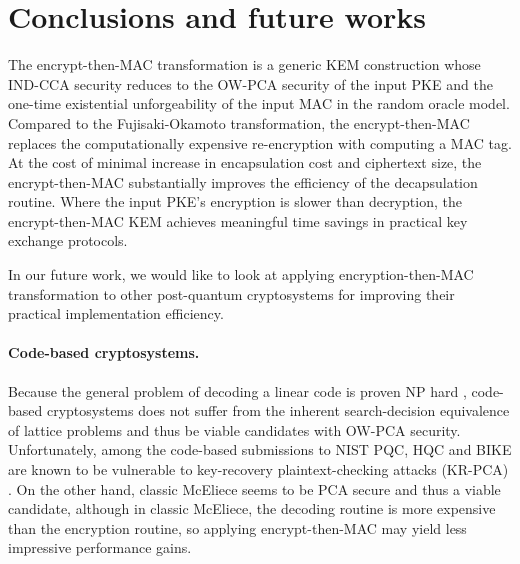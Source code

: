 \documentclass[journal=tches,submission]{iacrtrans}
\newcommand{\us}{\mu s}
\begin{document}
\begin{table}[h]
\end{table}

\section{Conclusions and future works}\label{sec:future-works}
The encrypt-then-MAC transformation is a generic KEM construction whose IND-CCA security reduces to the OW-PCA security of the input PKE and the one-time existential unforgeability of the input MAC in the random oracle model. Compared to the Fujisaki-Okamoto transformation, the encrypt-then-MAC replaces the computationally expensive re-encryption with computing a MAC tag. At the cost of minimal increase in encapsulation cost and ciphertext size, the encrypt-then-MAC substantially improves the efficiency of the decapsulation routine. Where the input PKE's encryption is slower than decryption, the encrypt-then-MAC KEM achieves meaningful time savings in practical key exchange protocols.

In our future work, we would like to look at applying encryption-then-MAC transformation to other post-quantum cryptosystems for improving their practical implementation efficiency.

\paragraph{Code-based cryptosystems.} Because the general problem of decoding a linear code is proven NP hard \cite{DBLP:journals/tit/BerlekampMT78}, code-based cryptosystems does not suffer from the inherent search-decision equivalence of lattice problems and thus be viable candidates with OW-PCA security. Unfortunately, among the code-based submissions to NIST PQC, HQC \cite{melchor2018hamming} and BIKE \cite{aragon2022bike} are known to be vulnerable to key-recovery plaintext-checking attacks (KR-PCA) \cite{DBLP:journals/tches/TanakaUXITH23}. On the other hand, classic McEliece \cite{classicmceliecespec} seems to be PCA secure and thus a viable candidate, although in classic McEliece, the decoding routine is more expensive than the encryption routine, so applying encrypt-then-MAC may yield less impressive performance gains.
\end{document}
